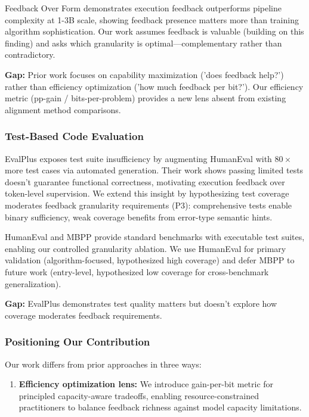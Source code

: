 Feedback Over Form demonstrates execution feedback outperforms pipeline complexity at 1-3B scale, showing feedback presence matters more than training algorithm sophistication. Our work assumes feedback is valuable (building on this finding) and asks which granularity is optimal---complementary rather than contradictory.

\textbf{Gap:} Prior work focuses on capability maximization ('does feedback help?') rather than efficiency optimization ('how much feedback per bit?'). Our efficiency metric (pp-gain / bits-per-problem) provides a new lens absent from existing alignment method comparisons.

\subsubsection{Test-Based Code Evaluation}

EvalPlus exposes test suite insufficiency by augmenting HumanEval with $80\times$ more test cases via automated generation. Their work shows passing limited tests doesn't guarantee functional correctness, motivating execution feedback over token-level supervision. We extend this insight by hypothesizing test coverage moderates feedback granularity requirements (P3): comprehensive tests enable binary sufficiency, weak coverage benefits from error-type semantic hints.

HumanEval and MBPP provide standard benchmarks with executable test suites, enabling our controlled granularity ablation. We use HumanEval for primary validation (algorithm-focused, hypothesized high coverage) and defer MBPP to future work (entry-level, hypothesized low coverage for cross-benchmark generalization).

\textbf{Gap:} EvalPlus demonstrates test quality matters but doesn't explore how coverage moderates feedback requirements.

\subsubsection{Positioning Our Contribution}

Our work differs from prior approaches in three ways:

\begin{enumerate}
\item \textbf{Efficiency optimization lens:} We introduce gain-per-bit metric for principled capacity-aware tradeoffs, enabling resource-constrained practitioners to balance feedback richness against model capacity limitations.
\end{enumerate}

